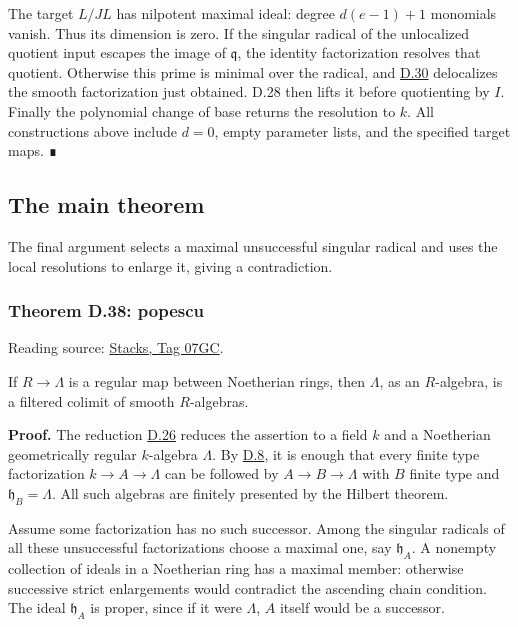 \documentclass[11pt,a4paper,openany]{report}
\newcounter{none}
\begin{document}
The target \(L/JL\) has nilpotent maximal ideal: degree \(d(e-1)+1\) monomials vanish. Thus its dimension is zero. If the singular radical of the unlocalized quotient input escapes the image of \(\mathfrak q\), the identity factorization resolves that quotient. Otherwise this prime is minimal over the radical, and \hyperref[AG-RG-S05-smoothing-lemma-delocalize-height-zero]{D.30} delocalizes the smooth factorization just obtained. D.28 then lifts it before quotienting by \(I\). Finally the polynomial change of base returns the resolution to \(k\). All constructions above include \(d=0\), empty parameter lists, and the specified target maps. ∎

\subsection{The main theorem}\label{AG-RG-S05-the-main-theorem}

\label{AG-RG-S05-smoothing-section-main}

The final argument selects a maximal unsuccessful singular radical and uses the local resolutions to enlarge it, giving a contradiction.

\label{AG-RG-S05-smoothing-theorem-popescu}

\subsubsection{Theorem D.38: popescu}\label{AG-RG-S05-theorem-d.38-popescu}

Reading source: \href{https://stacks.math.columbia.edu/tag/07GC}{Stacks, Tag 07GC}.

If \(R\to\Lambda\) is a regular map between Noetherian rings, then \(\Lambda\), as an \(R\)-algebra, is a filtered colimit of smooth \(R\)-algebras.

\textbf{Proof.} The reduction \hyperref[AG-RG-S05-smoothing-lemma-reduce-to-field]{D.26} reduces the assertion to a field \(k\) and a Noetherian geometrically regular \(k\)-algebra \(\Lambda\). By \hyperref[AG-RG-S05-smoothing-lemma-final-solve]{D.8}, it is enough that every finite type factorization \(k\to A\to\Lambda\) can be followed by \(A\to B\to\Lambda\) with \(B\) finite type and \(\mathfrak h_B=\Lambda\). All such algebras are finitely presented by the Hilbert theorem.

Assume some factorization has no such successor. Among the singular radicals of all these unsuccessful factorizations choose a maximal one, say \(\mathfrak h_A\). A nonempty collection of ideals in a Noetherian ring has a maximal member: otherwise successive strict enlargements would contradict the ascending chain condition. The ideal \(\mathfrak h_A\) is proper, since if it were \(\Lambda\), \(A\) itself would be a successor.
\end{document}
